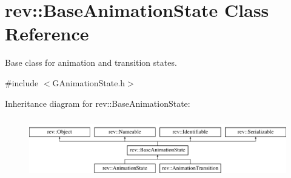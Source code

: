 \hypertarget{classrev_1_1_base_animation_state}{}\section{rev\+::Base\+Animation\+State Class Reference}
\label{classrev_1_1_base_animation_state}


Base class for animation and transition states.  




{\ttfamily \#include $<$G\+Animation\+State.\+h$>$}

Inheritance diagram for rev\+::Base\+Animation\+State\+:\begin{figure}[H]
\begin{center}
\leavevmode
\includegraphics[height=2.692308cm]{classrev_1_1_base_animation_state}
\end{center}
\end{figure}

